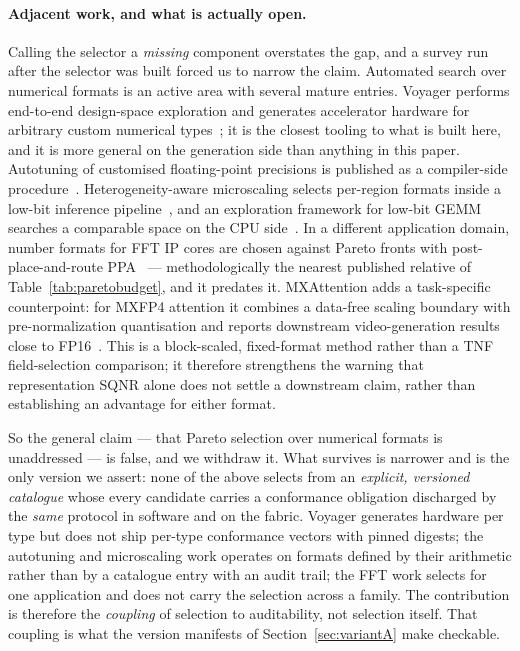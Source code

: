\documentclass[11pt]{article}
\theoremstyle{definition}
\begin{document}
\paragraph{Adjacent work, and what is actually open.}
Calling the selector a \emph{missing} component overstates the gap, and a survey
run after the selector was built forced us to narrow the claim. Automated search
over numerical formats is an active area with several mature entries. Voyager
performs end-to-end design-space exploration and generates accelerator hardware
for arbitrary custom numerical types~\cite{prabhu2026voyager}; it is the closest
tooling to what is built here, and it is more general on the generation side than
anything in this paper. Autotuning of customised floating-point precisions is
published as a compiler-side procedure~\cite{chen2026autotuning}. Heterogeneity-aware
microscaling selects per-region formats inside a low-bit inference
pipeline~\cite{ada2026mx}, and an exploration framework for low-bit GEMM searches
a comparable space on the CPU side~\cite{exagemm2026}. In a different application
domain, number formats for FFT IP cores are chosen against Pareto fronts with
post-place-and-route PPA~\cite{fftformats2026} --- methodologically the nearest
published relative of Table~\ref{tab:paretobudget}, and it predates it.
MXAttention adds a task-specific counterpoint: for MXFP4 attention it combines a
data-free scaling boundary with pre-normalization quantisation and reports
downstream video-generation results close to FP16~\cite{yu2026mxattention}.
This is a block-scaled, fixed-format method rather than a TNF field-selection
comparison; it therefore strengthens the warning that representation SQNR alone
does not settle a downstream claim, rather than establishing an advantage for
either format.

So the general claim --- that Pareto selection over numerical formats is
unaddressed --- is false, and we withdraw it. What survives is narrower and is the
only version we assert: none of the above selects from an \emph{explicit,
versioned catalogue} whose every candidate carries a conformance obligation
discharged by the \emph{same} protocol in software and on the fabric. Voyager
generates hardware per type but does not ship per-type conformance vectors with
pinned digests; the autotuning and microscaling work operates on formats defined
by their arithmetic rather than by a catalogue entry with an audit trail; the FFT
work selects for one application and does not carry the selection across a family.
The contribution is therefore the \emph{coupling} of selection to auditability, not
selection itself. That coupling is what the version manifests of
Section~\ref{sec:variantA} make checkable.
\end{document}
